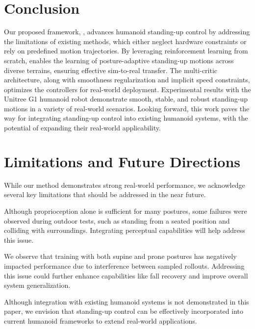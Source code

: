 \section{Conclusion}
Our proposed framework, \ours, advances humanoid standing-up control by addressing the limitations of existing methods, which either neglect hardware constraints or rely on predefined motion trajectories. By leveraging reinforcement learning from scratch, \ours enables the learning of posture-adaptive standing-up motions across diverse terrains, ensuring effective sim-to-real transfer. The multi-critic architecture, along with smoothness regularization and implicit speed constraints, optimizes the controllers for real-world deployment. Experimental results with the Unitree G1 humanoid robot demonstrate smooth, stable, and robust standing-up motions in a variety of real-world scenarios. Looking forward, this work paves the way for integrating standing-up control into existing humanoid systems, with the potential of expanding their real-world applicability.

\section{Limitations and Future Directions}
While our method demonstrates strong real-world performance, we acknowledge several key limitations that should be addressed in the near future. 

 Although proprioception alone is sufficient for many postures, some failures were observed during outdoor tests, such as standing from a seated position and colliding with surroundings. Integrating perceptual capabilities will help address this issue.

 We observe that training with both supine and prone postures has negatively impacted performance due to interference between sampled rollouts. Addressing this issue could further enhance capabilities like fall recovery and improve overall system generalization.

 Although integration with existing humanoid systems is not demonstrated in this paper, we envision that standing-up control can be effectively incorporated into current humanoid frameworks to extend real-world applications.
